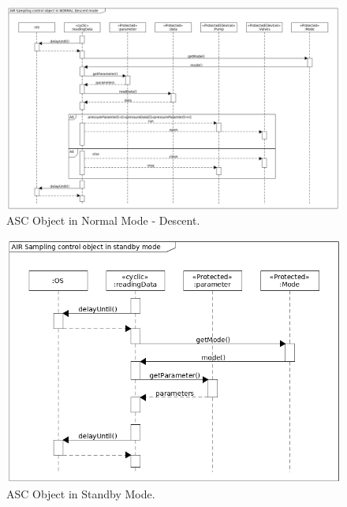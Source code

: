 \begin{landscape}
\begin{figure}[H]
    \centering
    \includegraphics[height=0.9\textwidth]{appendix/img/ASC-seq-dia-v1-2-b.png}
    \caption{ASC Object in Normal Mode - Descent.}
    \label{ASCb}
\end{figure}
\begin{figure}[H]
    \centering
    \includegraphics[height=0.9\textwidth]{appendix/img/ASC-seq-dia-v1-2-c.png}
    \caption{ASC Object in Standby Mode.}
    \label{ASCb}
\end{figure}

\end{landscape}
